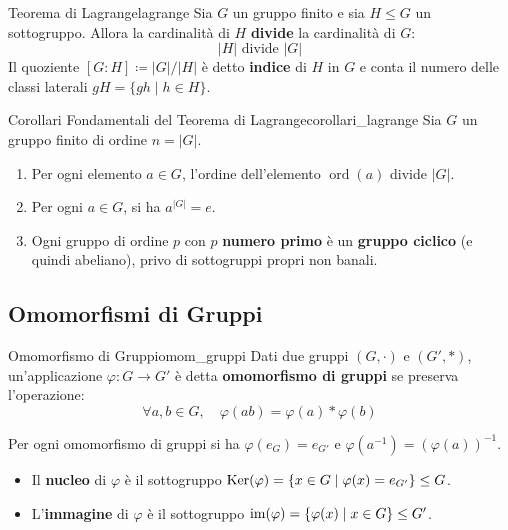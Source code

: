 \begin{teorema}{Teorema di Lagrange}{lagrange}
Sia $G$ un gruppo finito e sia $H \le G$ un sottogruppo. Allora la cardinalità di $H$ \textbf{divide} la cardinalità di $G$:
\[
    |H| \text{ divide } |G|
\]
Il quoziente $[G : H] \coloneqq |G| / |H|$ è detto \textbf{indice} di $H$ in $G$ e conta il numero delle classi laterali $gH = \{gh \mid h \in H\}$.
\end{teorema}

\begin{proposizione}{Corollari Fondamentali del Teorema di Lagrange}{corollari_lagrange}
Sia $G$ un gruppo finito di ordine $n = |G|$.
\begin{enumerate}
    \item Per ogni elemento $a \in G$, l'ordine dell'elemento $\operatorname{ord}(a)$ divide $|G|$.
    \item Per ogni $a \in G$, si ha $a^{|G|} = e$.
    \item Ogni gruppo di ordine $p$ con $p$ \textbf{numero primo} è un \textbf{gruppo ciclico} (e quindi abeliano), privo di sottogruppi propri non banali.
\end{enumerate}
\end{proposizione}

\subsection{Omomorfismi di Gruppi}

\begin{definizione}{Omomorfismo di Gruppi}{omom_gruppi}
Dati due gruppi $(G, \cdot)$ e $(G', *)$, un'applicazione $\varphi: G \to G'$ è detta \textbf{omomorfismo di gruppi} se preserva l'operazione:
\[
    \forall a, b \in G, \quad \varphi(ab) = \varphi(a) * \varphi(b)
\]
\end{definizione}

Per ogni omomorfismo di gruppi si ha $\varphi(e_G) = e_{G'}$ e $\varphi(a^{-1}) = (\varphi(a))^{-1}$.
\begin{itemize}
    \item Il \textbf{nucleo} di $\varphi$ è il sottogruppo $\operatorname{Ker}(\varphi) = \{x \in G \mid \varphi(x) = e_{G'}\} \le G$.
    \item L'\textbf{immagine} di $\varphi$ è il sottogruppo $\operatorname{im}(\varphi) = \{\varphi(x) \mid x \in G\} \le G'$.
\end{itemize}

